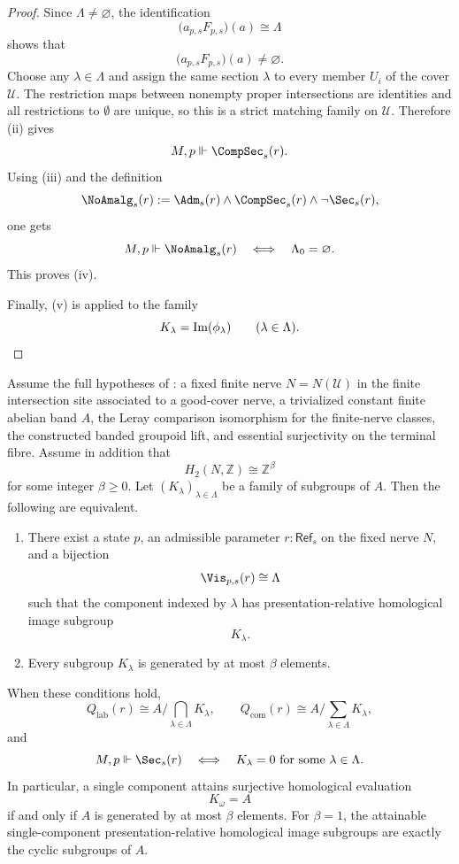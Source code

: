 \begin{proof}
Since $\Lambda\neq\varnothing$, the identification
\[
\bigl(a_{p,s}F_{p,s}\bigr)(a)\cong \Lambda
\]
shows that
\[
\bigl(a_{p,s}F_{p,s}\bigr)(a)\neq\varnothing.
\]
Choose any $\lambda\in\Lambda$ and assign the same section $\lambda$ to
every member $U_i$ of the cover $\mathcal U$. The restriction maps between
nonempty proper intersections are identities and all restrictions to
$\emptyset$ are unique, so this is a strict matching family on
$\mathcal U$. Therefore (ii) gives
\[
M,p\Vdash \CompSec_s(r).
\]
Using \textup{(iii)} and the definition
\[
\NoAmalg_s(r):=\Adm_s(r)\land \CompSec_s(r)\land \neg\Sec_s(r),
\]
one gets
\[
M,p\Vdash \NoAmalg_s(r)
\quad\Longleftrightarrow\quad
\Lambda_0=\varnothing.
\]
This proves \textup{(iv)}.

Finally, \textup{(v)} is  applied to the family
\[
K_\lambda=\operatorname{Im}(\phi_\lambda)
\qquad
(\lambda\in\Lambda).
\qedhere
\]
\end{proof}

\begin{corollary}\label{cor:torsion-free-h2-classification}
Assume the full hypotheses of : a
fixed finite nerve $N=N(\mathcal U)$ in the finite intersection site associated to a good-cover nerve,
a trivialized constant finite abelian band $A$, the Leray comparison
isomorphism for the finite-nerve classes, the constructed banded groupoid
lift, and essential surjectivity on the terminal fibre. Assume
in addition that
\[
H_2(N,\mathbb Z)\cong \mathbb Z^\beta
\]
for some integer $\beta\ge 0$. Let $(K_\lambda)_{\lambda\in\Lambda}$ be a family of subgroups of $A$. Then the following are equivalent.
\begin{enumerate}[label=(\roman*),nosep]
\item There exist a state $p$, an admissible parameter $r:\mathsf{Ref}_s$ on the fixed nerve $N$, and a bijection
\[
\Vis_{p,s}(r)\cong \Lambda
\]
such that the component indexed by $\lambda$ has presentation-relative homological image subgroup
\[
K_\lambda.
\]
\item Every subgroup $K_\lambda$ is generated by at most $\beta$ elements.
\end{enumerate}
When these conditions hold,
\[
Q_{\mathrm{lab}}(r)\cong A\Big/\bigcap_{\lambda\in\Lambda}K_\lambda,
\qquad
Q_{\mathrm{com}}(r)\cong A\Big/\sum_{\lambda\in\Lambda}K_\lambda,
\]
and
\[
M,p\Vdash \Sec_s(r)
\quad\Longleftrightarrow\quad
K_\lambda=0\ \text{for some}\ \lambda\in\Lambda.
\]
In particular, a single component attains surjective homological evaluation
\[
K_\omega=A
\]
if and only if $A$ is generated by at most $\beta$ elements. For $\beta=1$, the attainable single-component presentation-relative homological image subgroups are exactly the cyclic subgroups of $A$.
\end{corollary}

